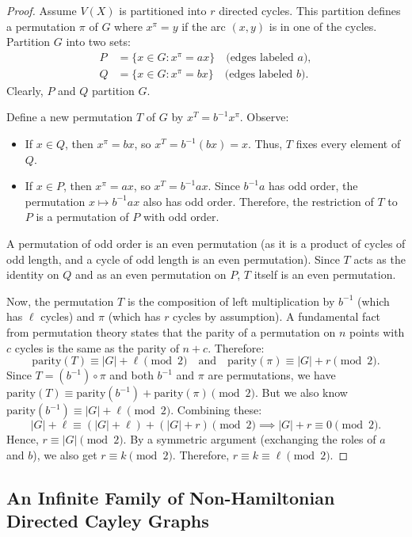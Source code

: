 \documentclass[12pt,a4paper,openany]{book}
\begin{document}
\begin{proof}
Assume $V(X)$ is partitioned into $r$ directed cycles. This partition defines a permutation $\pi$ of $G$ where $x^\pi = y$ if the arc $(x, y)$ is in one of the cycles. Partition $G$ into two sets:
\begin{align*}
P &= \{ x \in G : x^\pi = a x \} \quad \text{(edges labeled $a$)}, \\
Q &= \{ x \in G : x^\pi = b x \} \quad \text{(edges labeled $b$)}.
\end{align*}
Clearly, $P$ and $Q$ partition $G$.

Define a new permutation $T$ of $G$ by $x^T = b^{-1} x^\pi$. Observe:
\begin{itemize}
    \item If $x \in Q$, then $x^\pi = b x$, so $x^T = b^{-1}(b x) = x$. Thus, $T$ fixes every element of $Q$.
    \item If $x \in P$, then $x^\pi = a x$, so $x^T = b^{-1} a x$. Since $b^{-1}a$ has odd order, the permutation $x \mapsto b^{-1}a x$ also has odd order. Therefore, the restriction of $T$ to $P$ is a permutation of $P$ with odd order.
\end{itemize}
A permutation of odd order is an even permutation (as it is a product of cycles of odd length, and a cycle of odd length is an even permutation). Since $T$ acts as the identity on $Q$ and as an even permutation on $P$, $T$ itself is an even permutation.

Now, the permutation $T$ is the composition of left multiplication by $b^{-1}$ (which has $\ell$ cycles) and $\pi$ (which has $r$ cycles by assumption). A fundamental fact from permutation theory states that the parity of a permutation on $n$ points with $c$ cycles is the same as the parity of $n + c$. Therefore:
\[
\text{parity}(T) \equiv |G| + \ell \pmod{2} \quad \text{and} \quad \text{parity}(\pi) \equiv |G| + r \pmod{2}.
\]
Since $T = (b^{-1}) \circ \pi$ and both $b^{-1}$ and $\pi$ are permutations, we have $\text{parity}(T) \equiv \text{parity}(b^{-1}) + \text{parity}(\pi) \pmod{2}$. But we also know $\text{parity}(b^{-1}) \equiv |G| + \ell \pmod{2}$. Combining these:
\[
|G| + \ell \equiv (|G| + \ell) + (|G| + r) \pmod{2} \implies |G| + r \equiv 0 \pmod{2}.
\]
Hence, $r \equiv |G| \pmod{2}$. By a symmetric argument (exchanging the roles of $a$ and $b$), we also get $r \equiv k \pmod{2}$. Therefore, $r \equiv k \equiv \ell \pmod{2}$.
\end{proof}

\subsection{An Infinite Family of Non-Hamiltonian Directed Cayley Graphs}
\end{document}
